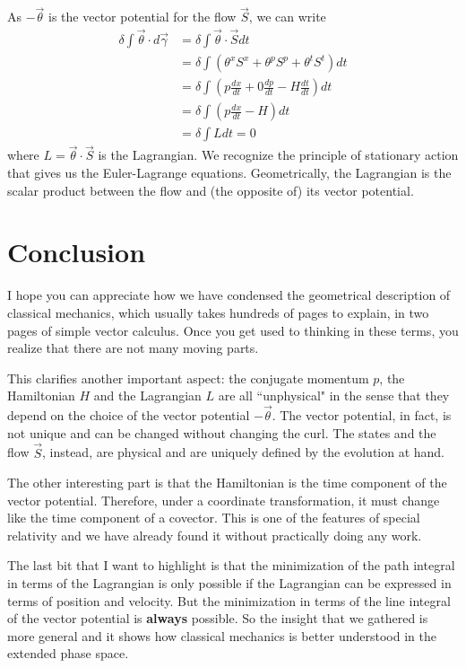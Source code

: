 \documentclass[aps,pra,10pt,floatfix,nofootinbib]{revtex4-1}
\theoremstyle{definition}
\begin{document}
As $-\vec{\theta}$ is the vector potential for the flow $\vec{S}$, we can write
\begin{equation}
\begin{aligned}
\delta \int \vec{\theta} \cdot d\vec{\gamma} &= \delta \int \vec{\theta} \cdot \vec{S} dt \\
&= \delta \int (\theta^x S^x + \theta ^p S^p + \theta^t S^t)dt \\
&= \delta \int \left( p \frac{dx}{dt} + 0 \frac{dp}{dt} - H \frac{dt}{dt} \right)dt \\
&= \delta \int \left( p \frac{dx}{dt} - H  \right)dt \\
&= \delta \int L dt =  0
\end{aligned}
\label{stationaryAction}
\end{equation}
where $L= \vec{\theta} \cdot \vec{S}$ is the Lagrangian. We recognize the principle of stationary action that gives us the Euler-Lagrange equations. Geometrically, the Lagrangian is the scalar product between the flow and (the opposite of) its vector potential.

\section{Conclusion}

I hope you can appreciate how we have condensed the geometrical description of classical mechanics, which usually takes hundreds of pages to explain, in two pages of simple vector calculus. Once you get used to thinking in these terms, you realize that there are not many moving parts.

This clarifies another important aspect: the conjugate momentum $p$, the Hamiltonian $H$ and the Lagrangian $L$ are all ``unphysical" in the sense that they depend on the choice of the vector potential $-\vec{\theta}$. The vector potential, in fact, is not unique and can be changed without changing the curl. The states and the flow $\vec{S}$, instead, are physical and are uniquely defined by the evolution at hand.

The other interesting part is that the Hamiltonian is the time component of the vector potential. Therefore, under a coordinate transformation, it must change like the time component of a covector. This is one of the features of special relativity and we have already found it without practically doing any work.

The last bit that I want to highlight is that the minimization of the path integral in terms of the Lagrangian is only possible if the Lagrangian can be expressed in terms of position and velocity. But the minimization in terms of the line integral of the vector potential is \textbf{always} possible. So the insight that we gathered is more general and it shows how classical mechanics is better understood in the extended phase space.
\end{document}
